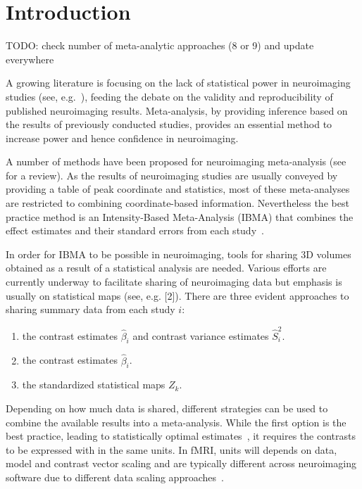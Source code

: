 \documentclass[preprint,12pt]{elsarticle}
\newcommand{\effectvector}{\hat\beta}
\newcommand{\effect}[1][i]{\effectvector_{#1}}
\newcommand{\vareffect}[1][i]{\hat S^2_{#1}}
\newcommand{\zeffect}[1][\studyidx]{Z_{#1}}
\newcommand{\studyidx}{k}
\begin{document}
\linenumbers

\section{Introduction}

TODO: check number of meta-analytic approaches (8 or 9) and update everywhere

A growing literature is focusing on the lack of statistical power in neuroimaging studies (see, e.g.~\cite{Button2013}), feeding the debate on the validity and reproducibility of published neuroimaging results. Meta-analysis, by providing inference based on the results of previously conducted studies, provides an essential method to increase power and hence confidence in neuroimaging.

A number of methods have been proposed for neuroimaging meta-analysis (see~\cite{Radua2012} for a review). As the results of neuroimaging studies are usually conveyed by providing a table of peak coordinate and statistics, most of these meta-analyses are restricted to combining coordinate-based information. Nevertheless the best practice method is an Intensity-Based Meta-Analysis (IBMA) that combines the effect estimates and their standard errors from each study~\cite{Salimi-khorshidi2009}. 

In order for IBMA to be possible in neuroimaging, tools for sharing 3D volumes obtained as a result of a statistical analysis are needed. Various efforts are currently underway to facilitate sharing of neuroimaging data but emphasis is usually on statistical maps (see, e.g. [2]). There are three evident approaches to sharing summary data from each study $i$:
\begin{enumerate}
	\item the contrast estimates $\effect$ and contrast variance estimates $\vareffect$.
	\item the contrast estimates $\effect$.	
	\item the standardized statistical maps $\zeffect$.		
\end{enumerate}

Depending on how much data is shared, different strategies can be used to combine the available results into a meta-analysis. While the first option is the best practice, leading to statistically optimal estimates~\cite{Cummings2004}, it requires the contrasts to be expressed with in the same units. In fMRI, units will depends on data, model and contrast vector scaling and are typically different across neuroimaging software due to different data scaling approaches~\cite{Nichols2012units}.
\end{document}
